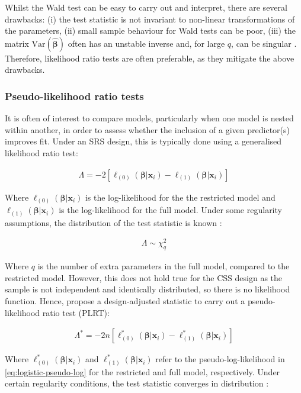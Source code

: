 Whilst the Wald test can be easy to carry out and interpret, there are several drawbacks: (i) the test statistic is not invariant to non-linear transformations of the parameters, (ii) small sample behaviour for Wald tests can be poor, (iii) the matrix $\text{Var}(\hat{\bm{\beta}})$ often has an unstable inverse and, for large $q$, can be singular \citep{lumley2014}. Therefore, likelihood ratio tests are often preferable, as they mitigate the above drawbacks.

\subsubsection{Pseudo-likelihood ratio tests}

It is often of interest to compare models, particularly when one model is nested within another, in order to assess whether the inclusion of a given predictor(s) improves fit. Under an SRS design, this is typically done using a generalised likelihood ratio test:

\begin{align}
\label{eq:glrt}
\Lambda = -2[ \ell_{(0)}(\bm{\beta} | \mathbf{x}_{i}) - \ell_{(1)}(\bm{\beta} | \mathbf{x}_{i}) ]
\end{align}

Where $\ell_{(0)}(\bm{\beta} | \mathbf{x}_{i})$ is the log-likelihood for the the restricted model and $\ell_{(1)}(\bm{\beta} | \mathbf{x}_{i})$ is the log-likelihood for the full model. Under some regularity assumptions, the distribution of the test statistic is known \citep{wilks1938}:

\begin{align}
\label{eq:glrt-distribution}
\Lambda \sim \chi^{2}_{q}
\end{align}

Where $q$ is the number of extra parameters in the full model, compared to the restricted model. However, this does not hold true for the CSS design as the sample is not independent and identically distributed, so there is no likelihood function. Hence, \citet{lumley2014} propose a design-adjusted statistic to carry out a pseudo-likelihood ratio test (PLRT):

\begin{align}
\label{eq:plrt}
\Lambda^{*} = -2n[ \ell^{*}_{(0)}(\bm{\beta} | \mathbf{x}_{i}) - \ell^{*}_{(1)}(\bm{\beta} | \mathbf{x}_{i}) ]
\end{align}

Where $\ell^{*}_{(0)}(\bm{\beta} | \mathbf{x}_{i})$ and $\ell^{*}_{(1)}(\bm{\beta} | \mathbf{x}_{i})$ refer to the pseudo-log-likelihood in \autoref{eq:logistic-pseudo-log} for the restricted and full model, respectively. Under certain regularity conditions, the test statistic converges in distribution \citep{lumley2014}:

